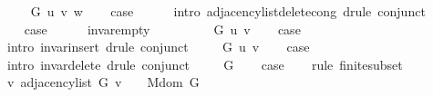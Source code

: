 \begin{isabellebody}
\isamarkupfalse%
\isanewline
\ \ \isamarkupfalse%
\ {\isacharparenleft}{\kern0pt}{}\ G\ u\ v\ w{\isacharparenright}{\kern0pt}\isanewline
\ \ \isamarkupfalse%
\ {\isacharquery}{\kern0pt}case\isanewline
\ \ \ \ \isamarkupfalse%
\ {\isacharparenleft}{\kern0pt}intro\ adjacency{\isacharunderscore}{\kern0pt}list{\isacharunderscore}{\kern0pt}delete{\isacharprime}{\kern0pt}{\isacharunderscore}{\kern0pt}cong{\isacharparenright}{\kern0pt}\ {\isacharparenleft}{\kern0pt}drule\ conjunct{}{\isacharparenright}{\kern0pt}\isanewline
{}\isamarkupfalse%
\isanewline
\ \ \isamarkupfalse%
\ {}\isanewline
\ \ \isamarkupfalse%
\ {\isacharquery}{\kern0pt}case\isanewline
\ \ \ \ \isamarkupfalse%
\ invar{\isacharunderscore}{\kern0pt}empty\isanewline
\ \ \ \ \isacommand{{\isachardot}{\kern0pt}}\isamarkupfalse%
\isanewline
{}\isamarkupfalse%
\isanewline
\ \ \isamarkupfalse%
\ {\isacharparenleft}{\kern0pt}{}\ G\ u\ v{\isacharparenright}{\kern0pt}\isanewline
\ \ \isamarkupfalse%
\ {\isacharquery}{\kern0pt}case\isanewline
\ \ \ \ \isamarkupfalse%
\ {\isacharparenleft}{\kern0pt}intro\ invar{\isacharunderscore}{\kern0pt}insert{\isacharprime}{\kern0pt}{\isacharparenright}{\kern0pt}\ {\isacharparenleft}{\kern0pt}drule\ conjunct{}{\isacharparenright}{\kern0pt}\isanewline
{}\isamarkupfalse%
\isanewline
\ \ \isamarkupfalse%
\ {\isacharparenleft}{\kern0pt}{}\ G\ u\ v{\isacharparenright}{\kern0pt}\isanewline
\ \ \isamarkupfalse%
\ {\isacharquery}{\kern0pt}case\isanewline
\ \ \ \ \isamarkupfalse%
\ {\isacharparenleft}{\kern0pt}intro\ invar{\isacharunderscore}{\kern0pt}delete{\isacharprime}{\kern0pt}{\isacharparenright}{\kern0pt}\ {\isacharparenleft}{\kern0pt}drule\ conjunct{}{\isacharparenright}{\kern0pt}\isanewline
{}\isamarkupfalse%
\isanewline
\ \ \isamarkupfalse%
\ {\isacharparenleft}{\kern0pt}{}\ G{\isacharparenright}{\kern0pt}\isanewline
\ \ \isamarkupfalse%
\ {\isacharquery}{\kern0pt}case\isanewline
\ \ \isamarkupfalse%
\ {\isacharparenleft}{\kern0pt}rule\ finite{\isacharunderscore}{\kern0pt}subset{\isacharparenright}{\kern0pt}\isanewline
\ \ \ \ \isamarkupfalse%
\ {\isachardoublequoteopen}{\isacharbraceleft}{\kern0pt}v{\isachardot}{\kern0pt}\ adjacency{\isacharunderscore}{\kern0pt}list\ G\ v\ {\isasymnoteq}\ {\isacharbrackleft}{\kern0pt}{\isacharbrackright}{\kern0pt}{\isacharbraceright}{\kern0pt}\ {\isasymsubseteq}\ M{\isachardot}{\kern0pt}dom\ G{\isachardoublequoteclose}\isanewline

\end{isabellebody}
